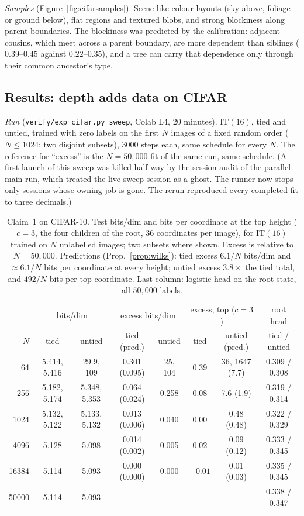 \documentclass[11pt]{article}
\theoremstyle{definition}
\begin{document}
\emph{Samples} (Figure~\ref{fig:cifarsamples}). Scene-like colour layouts (sky above, foliage or ground below),
flat regions and textured blobs, and strong blockiness along parent boundaries. The blockiness was predicted
by the calibration: adjacent cousins, which meet across a parent boundary, are more dependent than siblings
($0.39$--$0.45$ against $0.22$--$0.35$), and a tree can carry that dependence only through their common ancestor's
type.

\subsection{Results: depth adds data on CIFAR}\label{sec:cifar-claim1}
\emph{Run} (\texttt{verify/exp\_cifar.py sweep}, Colab L4, $20$ minutes). $\mathrm{IT}(16)$, tied and untied, trained
with zero labels on the first $N$ images of a fixed random order ($N\le1024$: two disjoint subsets), $3000$ steps
each, same schedule for every $N$. The reference for ``excess'' is the $N=50{,}000$ fit of the same run, same
schedule. (A first launch of this sweep was killed half-way by the session audit of the parallel main run, which
treated the live sweep session as a ghost. The runner now stops only sessions whose owning job is gone. The
rerun reproduced every completed fit to three decimals.)

\begin{table}[h]\centering
\caption{Claim~1 on CIFAR-10. Test bits/dim and bits per coordinate at the top height ($c=3$, the four children of
the root, $36$ coordinates per image), for $\mathrm{IT}(16)$ trained on $N$ unlabelled images; two subsets where
shown. Excess is relative to $N=50{,}000$. Predictions (Prop.~\ref{prop:wilks}): tied excess $6.1/N$ bits/dim and
$\approx6.1/N$ bits per coordinate at every height; untied excess $3.8\times$ the tied total, and $492/N$ bits per
top coordinate. Last column: logistic head on the root state, all $50{,}000$ labels.}\label{tab:cifarclaim1}
\small\begin{tabular}{r|cc|cc|cc|c}\toprule
& \multicolumn{2}{c|}{bits/dim} & \multicolumn{2}{c|}{excess bits/dim} & \multicolumn{2}{c|}{excess, top ($c{=}3$)} & root head\\
$N$ & tied & untied & tied (pred.) & untied & tied & untied (pred.) & tied / untied\\\midrule
64 & 5.414, 5.416 & 29.9, 109 & 0.301 (0.095) & 25, 104 & 0.39 & 36, 1647 (7.7) & 0.309 / 0.308\\
256 & 5.182, 5.174 & 5.348, 5.353 & 0.064 (0.024) & 0.258 & 0.08 & 7.6 (1.9) & 0.319 / 0.314\\
1024 & 5.132, 5.122 & 5.133, 5.132 & 0.013 (0.006) & 0.040 & 0.00 & 0.48 (0.48) & 0.322 / 0.329\\
4096 & 5.128 & 5.098 & 0.014 (0.002) & 0.005 & 0.02 & 0.09 (0.12) & 0.333 / 0.345\\
16384 & 5.114 & 5.093 & 0.000 (0.000) & 0.000 & $-0.01$ & 0.01 (0.03) & 0.335 / 0.345\\
50000 & 5.114 & 5.093 & -- & -- & -- & -- & 0.338 / 0.347\\
\bottomrule\end{tabular}
\end{table}
\end{document}
